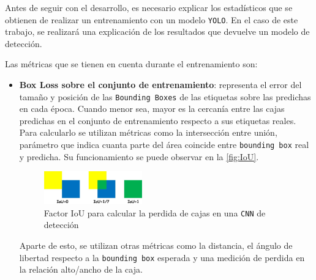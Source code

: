 Antes de seguir con el desarrollo, es necesario explicar los estadísticos que se obtienen de realizar un entrenamiento con un modelo \texttt{YOLO}. En el caso de este trabajo, se realizará una 
explicación de los resultados que devuelve un modelo de detección.

Las métricas que se tienen en cuenta durante el entrenamiento son:

\begin{itemize}
    \item \textbf{Box Loss sobre el conjunto de entrenamiento}: representa el error del tamaño y posición de las \texttt{Bounding Boxes} de las etiquetas sobre las predichas en cada época. Cuando menor sea, 
    mayor es la cercanía entre las cajas predichas en el conjunto de entrenamiento respecto a sus etiquetas reales.\newline 
    Para calcularlo se utilizan métricas como la intersección entre unión, parámetro que indica cuanta parte del área coincide entre \texttt{bounding box} real y predicha. Su funcionamiento se puede observar 
    en la \autoref{fig:IoU}.

    \begin{figure}[H]
        \centering
        \includegraphics[width=0.4\textwidth]{images/13/a/IoU.png}
        \caption{Factor IoU para calcular la perdida de cajas en una \texttt{CNN} de detección}
        \label{fig:IoU}
    \end{figure}

    Aparte de esto, se utilizan otras métricas como la distancia, el ángulo de libertad respecto a la \texttt{bounding box} esperada y una medición de perdida en la relación alto/ancho de la caja.


\end{itemize}
